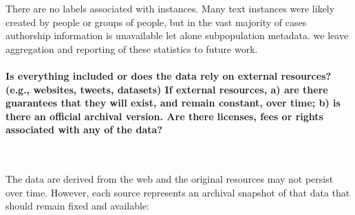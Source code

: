 There are no labels associated with instances. 
Many text instances were likely created by people or groups of people, but in the vast majority of cases authorship information is unavailable let alone subpopulation metadata. we leave aggregation and reporting of these statistics to future work.

\paragraph{Is everything included or does the data rely on external resources? (e.g., websites, tweets, datasets) If external resources, a) are there guarantees that they will exist, and remain constant, over time; b) is there an official archival version. Are there licenses, fees or rights associated with any of the data?}~

The data are derived from the web and the original resources may not persist over time. However, each source represents an archival snapshot of that data that should remain fixed and available: 

